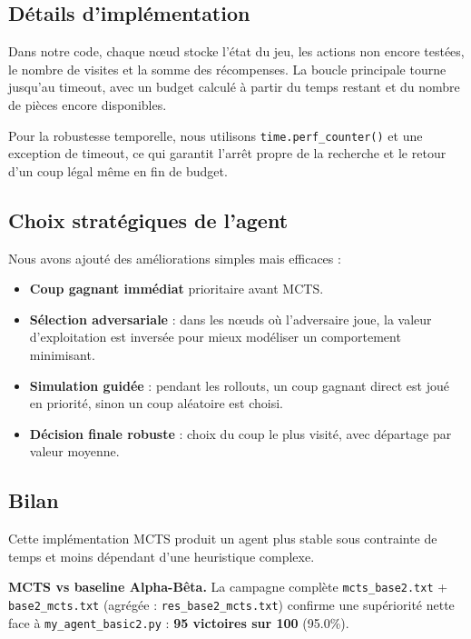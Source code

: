 \subsection{Détails d'implémentation}
Dans notre code, chaque nœud stocke l'état du jeu, les actions non encore testées, le nombre de visites et la somme des récompenses. La boucle principale tourne jusqu'au timeout, avec un budget calculé à partir du temps restant et du nombre de pièces encore disponibles.

Pour la robustesse temporelle, nous utilisons \texttt{time.perf\_counter()} et une exception de timeout, ce qui garantit l'arrêt propre de la recherche et le retour d'un coup légal même en fin de budget.

\subsection{Choix stratégiques de l'agent}
Nous avons ajouté des améliorations simples mais efficaces :
\begin{itemize}
    \item \textbf{Coup gagnant immédiat} prioritaire avant MCTS.
    \item \textbf{Sélection adversariale} : dans les nœuds où l'adversaire joue, la valeur d'exploitation est inversée pour mieux modéliser un comportement minimisant.
    \item \textbf{Simulation guidée} : pendant les rollouts, un coup gagnant direct est joué en priorité, sinon un coup aléatoire est choisi.
    \item \textbf{Décision finale robuste} : choix du coup le plus visité, avec départage par valeur moyenne.
\end{itemize}

\subsection{Bilan}
Cette implémentation MCTS produit un agent plus stable sous contrainte de temps et moins dépendant d'une heuristique complexe.

\textbf{MCTS vs baseline Alpha-Bêta.} La campagne complète \texttt{mcts\_base2.txt} + \texttt{base2\_mcts.txt} (agrégée : \texttt{res\_base2\_mcts.txt}) confirme une supériorité nette face à \texttt{my\_agent\_basic2.py} : \textbf{95 victoires sur 100} (95.0\%).\\

